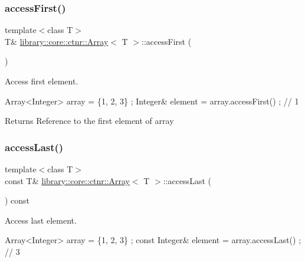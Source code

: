 \subsubsection{\texorpdfstring{access\+First()}{accessFirst()}\hspace{0.1cm}{\footnotesize\ttfamily [2/2]}}
{\footnotesize\ttfamily template$<$class T$>$ \\
T\& \hyperlink{classlibrary_1_1core_1_1ctnr_1_1Array}{library\+::core\+::ctnr\+::\+Array}$<$ T $>$\+::access\+First (\begin{DoxyParamCaption}{ }\end{DoxyParamCaption})}



Access first element. 


\begin{DoxyCode}
Array<Integer> array = \{1, 2, 3\} ;
Integer& element = array.accessFirst() ; \textcolor{comment}{// 1}
\end{DoxyCode}


\begin{DoxyReturn}{Returns}
Reference to the first element of array 
\end{DoxyReturn}
\mbox{\label{classlibrary_1_1core_1_1ctnr_1_1Array_ad95dcce8ddaf163903a2327f766dbc8a}} 
\subsubsection{\texorpdfstring{access\+Last()}{accessLast()}\hspace{0.1cm}{\footnotesize\ttfamily [1/2]}}
{\footnotesize\ttfamily template$<$class T$>$ \\
const T\& \hyperlink{classlibrary_1_1core_1_1ctnr_1_1Array}{library\+::core\+::ctnr\+::\+Array}$<$ T $>$\+::access\+Last (\begin{DoxyParamCaption}{ }\end{DoxyParamCaption}) const}



Access last element. 


\begin{DoxyCode}
Array<Integer> array = \{1, 2, 3\} ;
\textcolor{keyword}{const} Integer& element = array.accessLast() ; \textcolor{comment}{// 3}
\end{DoxyCode}


